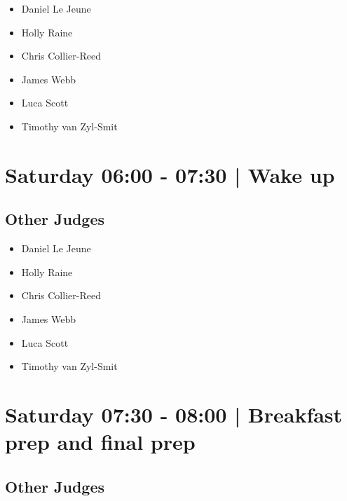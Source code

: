 \documentclass[10pt, A5]{article}
\begin{document}
            \begin{itemize}
                            \item Daniel Le Jeune
                            \item Holly Raine
                            \item Chris Collier-Reed
                            \item James Webb
                            \item Luca Scott
                            \item Timothy van Zyl-Smit
                        \end{itemize}
        

            \section*{Saturday 06:00
        -
        07:30
        |
         Wake up}
        
                
        \subsection*{Other Judges}
        
            \begin{itemize}
                            \item Daniel Le Jeune
                            \item Holly Raine
                            \item Chris Collier-Reed
                            \item James Webb
                            \item Luca Scott
                            \item Timothy van Zyl-Smit
                        \end{itemize}
        

            \section*{Saturday 07:30
        -
        08:00
        |
         Breakfast prep and final prep}
        
                
        \subsection*{Other Judges}
        
\end{document}
